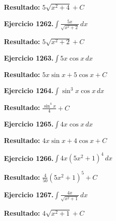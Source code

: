\documentclass[10pt,a4paper]{article}
\begin{document}
\begin{solbox}
\textbf{Resultado:} \(\displaystyle 5\sqrt{x^2+4} + C\)
\end{solbox}

\begin{ejbox}
\textbf{Ejercicio 1262.}\quad $\int \frac{5x}{\sqrt{x^2+2}}\,dx$
\end{ejbox}

\begin{solbox}
\textbf{Resultado:} \(\displaystyle 5\sqrt{x^2+2} + C\)
\end{solbox}

\begin{ejbox}
\textbf{Ejercicio 1263.}\quad $\int 5x \cos x\,dx$
\end{ejbox}

\begin{solbox}
\textbf{Resultado:} \(\displaystyle 5x\sin x + 5\cos x + C\)
\end{solbox}

\newpage
\begin{ejbox}
\textbf{Ejercicio 1264.}\quad $\int \sin^{3}x \cos x\,dx$
\end{ejbox}

\begin{solbox}
\textbf{Resultado:} \(\displaystyle \frac{\sin^{4}x}{4} + C\)
\end{solbox}

\begin{ejbox}
\textbf{Ejercicio 1265.}\quad $\int 4x \cos x\,dx$
\end{ejbox}

\begin{solbox}
\textbf{Resultado:} \(\displaystyle 4x\sin x + 4\cos x + C\)
\end{solbox}

\begin{ejbox}
\textbf{Ejercicio 1266.}\quad $\int 4x(5x^2 + 1)^{4}\,dx$
\end{ejbox}

\begin{solbox}
\textbf{Resultado:} \(\displaystyle \frac{4}{50}(5x^2+1)^{5} + C\)
\end{solbox}

\newpage
\begin{ejbox}
\textbf{Ejercicio 1267.}\quad $\int \frac{4x}{\sqrt{x^2+1}}\,dx$
\end{ejbox}

\begin{solbox}
\textbf{Resultado:} \(\displaystyle 4\sqrt{x^2+1} + C\)
\end{solbox}
\end{document}
